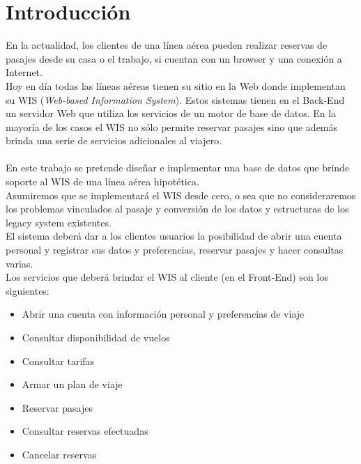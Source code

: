 \documentclass[a4paper,10pt]{article}
\begin{document}
		
		\maketitle

\newpage
\thispagestyle{empty}
\mbox{}

	
 \tableofcontents
\newpage

\section{Introducci\'on}
 
 En la actualidad, los clientes de una línea aérea pueden realizar reservas de pasajes desde su casa o el trabajo, si cuentan con un browser y una conexión a Internet.\\
 
Hoy en día todas las líneas aéreas tienen su sitio en la Web donde implementan su WIS (\textit{Web-based Information System}). Estos sistemas tienen en el Back-End un servidor Web que utiliza los servicios de un motor de base de datos.
En la mayoría de los casos el WIS no sólo permite reservar pasajes sino que además brinda una serie de servicios adicionales al viajero.\\
\\

En este trabajo se pretende diseñar e implementar una base de datos que brinde soporte al WIS de
una línea aérea hipotética.\\

Asumiremos que se implementará el WIS desde cero, o sea que no consideraremos los problemas
vinculados al pasaje y conversión de los datos y estructuras de los legacy system existentes.\\

El sistema deberá dar a los clientes usuarios la posibilidad de abrir una cuenta personal y registrar
sus datos y preferencias, reservar pasajes y hacer consultas varias.
\\

Los servicios que deberá brindar el WIS al cliente (en el Front-End) son los
siguientes:
\begin{itemize}
\item Abrir una cuenta con información personal y preferencias de viaje
\item Consultar disponibilidad de vuelos
\item Consultar tarifas
\item Armar un plan de viaje
\item Reservar pasajes
\item Consultar reservas efectuadas
\item Cancelar reservas
\end{itemize}
\end{document}
